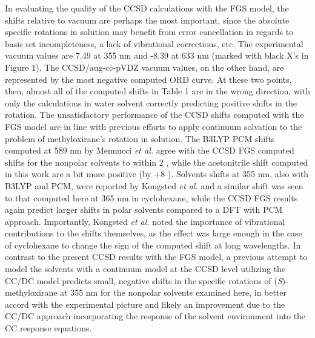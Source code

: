 In evaluating the quality of the CCSD calculations with the
FGS model, the shifts relative to vacuum are perhaps the most important,
since the absolute specific rotations in solution may benefit from
error cancellation in regards to basis set incompleteness, a lack of
vibrational corrections, etc. The experimental vacuum values\cite{Wilson:05}
are 7.49 \rotunits at 355 nm and -8.39 \rotunits at 633 nm (marked with
black X's in Figure 1). The CCSD/aug-cc-pVDZ vacuum values,
on the other hand, are represented by the most negative computed ORD curve.
At these two points, then, almost all of the computed shifts in Table 1
are in the wrong direction, with only the calculations in water solvent
correctly predicting positive shifts in the rotation. The unsatisfactory
performance of the CCSD shifts computed with the FGS model are in line
with previous efforts to apply continuum solvation to the problem of
methyloxirane's rotation in solution. The B3LYP PCM shifts
computed at 589 nm by Mennucci \emph{et al.}\cite{Mennucci:02}
agree with the CCSD FGS computed shifts for the nonpolar solvents
to within 2 \rotunits, while the acetonitrile shift computed in this work
are a bit more positive (by $+8$ \rotunits). Solvents shifts at 355
nm, also with B3LYP and PCM, were reported by Kongsted \emph{et al.}\cite{Kongsted:08}
and a similar shift was seen to that computed here at 365 nm in cyclohexane,
while the CCSD FGS results again predict larger shifts
in polar solvents compared to a DFT with PCM approach. 
Importantly, Kongsted \emph{et al.}
noted the importance of vibrational contributions to the shifts themselves,
as the effect was large enough in the case of cyclohexane to change the sign
of the computed shift at long wavelengths.\cite{Kongsted:08}
In contrast to the present CCSD results with the FGS model,
a previous attempt to model the solvents with a continuum model at the
CCSD level\cite{Kongsted:06} utilizing the CC/DC model predicts small, negative
shifts in the specific rotations of (\emph{S})-methyloxirane at 355 nm
for the nonpolar solvents examined here, in better accord with the experimental
picture and likely an improvement due to the CC/DC approach incorporating
the response of the solvent environment into the CC response equations.
\cite{Christiansen:99}

